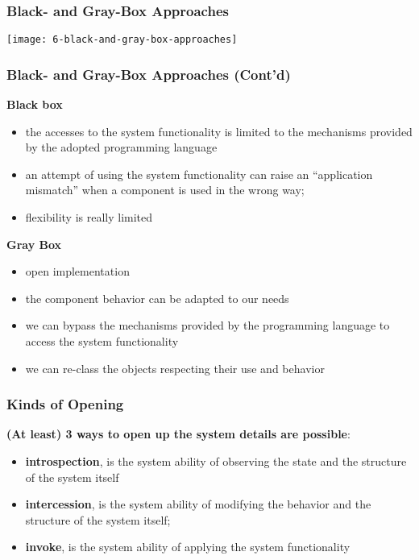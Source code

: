 \subsubsection{Black- and Gray-Box Approaches}

\begin{center}
\texttt{[image: 6-black-and-gray-box-approaches]}
\end{center}

\subsubsection{Black- and Gray-Box Approaches (Cont'd)}

\textbf{Black box}
\begin{itemize}
	\item the accesses to the system functionality is limited to the mechanisms provided by the adopted programming language
	\item an attempt of using the system functionality can raise an “application mismatch” when a component is used in the wrong way;
	\item flexibility is really limited
\end{itemize}

\textbf{Gray Box}
\begin{itemize}
	\item open implementation
	\item the component behavior can be adapted to our needs
	\item we can bypass the mechanisms provided by the programming language to access the system functionality
	\item we can re-class the objects respecting their use and behavior
\end{itemize}

\subsubsection{Kinds of Opening}

\textbf{(At least) 3 ways to open up the system details are possible}:

\begin{itemize}
	\item \textbf{introspection}, is the system ability of observing the state and the structure of the system itself
	\item \textbf{intercession}, is the system ability of modifying the behavior and the structure of the system itself;
	\item \textbf{invoke}, is the system ability of applying the system functionality
	
\end{itemize}

